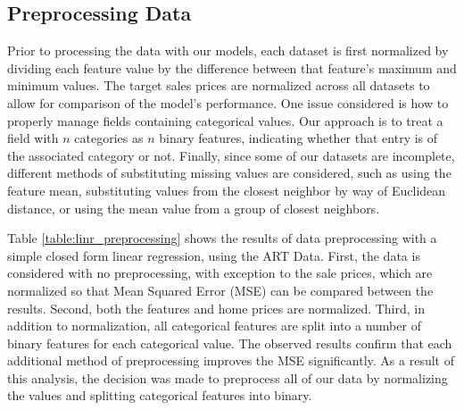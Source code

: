 \documentclass[10pt]{article}
\begin{document}
\begin{multicols}{2}
		\section{Preprocessing Data}
		Prior to processing the data with our models, each dataset is first normalized by dividing each feature value by the difference between that feature's maximum and minimum values. The target sales prices are normalized across all datasets to allow for comparison of the model's performance. One issue considered is how to properly manage fields containing categorical values. Our approach is to treat a field with \(n\) categories as \(n\) binary features, indicating whether that entry is of the associated category or not. Finally, since some of our datasets are incomplete, different methods of substituting missing values are considered, such as using the feature mean, substituting values from the closest neighbor by way of Euclidean distance, or using the mean value from a group of closest neighbors.

        Table \ref{table:linr_preprocessing} shows the results of data preprocessing with a simple closed form linear regression, using the ART Data. First, the data is considered with no preprocessing, with exception to the sale prices, which are normalized so that Mean Squared Error (MSE) can be compared between the results. Second, both the features and home prices are normalized. Third, in addition to normalization, all categorical features are split into a number of binary features for each categorical value. The observed results confirm that each additional method of preprocessing improves the MSE significantly. As a result of this analysis, the decision was made to preprocess all of our data by normalizing the values and splitting categorical features into binary.
        

\end{multicols}
\end{document}
